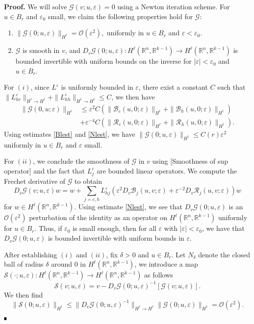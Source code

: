 \documentclass[letterpaper,11pt]{article}
\newcommand{\R}{\mathbb{R}}
\newcommand{\rmO}{\mathcal{O}}
\newcommand{\eps}{\varepsilon}
\newcommand{\Rm}{\mathcal{R}}
\newcommand{\G}{\mathcal{G}}
\newcommand{\cS}{\mathcal{S}}
\numberwithin{equation}{section}
\theoremstyle{plain}
\theoremstyle{remark}
\newenvironment{Proof}[1][.]%
 {\begin{trivlist}\item[]\textbf{Proof#1 }}%
 {\hspace*{\fill}$\rule{0.3\baselineskip}{0.35\baselineskip}$\end{trivlist}}
\begin{document}
\begin{Proof}We will solve $\G(v;u,\eps)=0$ using a Newton iteration scheme. For $u \in B_r$ and $\eps_0$ small, we claim the following properties hold for $\G$:
\begin{enumerate}
\item $\|\G(0;u,\eps)\|_{H^\ell} = \rmO(\eps^2),$ uniformly in $u\in B_r$ and $\eps < \eps_0$.
\item $\G$ is smooth in $v$, and $D_v \G(0; u, \eps):H^\ell(\R^n,\R^{k-1}) \to H^\ell(\R^n,\R^{k-1})$ is bounded invertible with uniform bounds on the inverse for $|\eps|<\eps_0$ and $u \in B_r$. 
\end{enumerate}

For $(i)$, since $L^\eps$ is uniformly bounded in $\eps$, there exist a constant $C$ such that $\| L_{hc}^\eps\|_{H^\ell \to H^\ell}+\| L_{hh}^\eps \|_{H^\ell \to H^\ell } \le C$, we then have
\begin{align*}
\|\G(0,u;\eps)\|_{H^\ell} &\le \eps^2C(\|\mathcal{B}_c(u,0;\eps)\|_{H^\ell} +\|\mathcal{B}_h(u,0;\eps)\|_{H^\ell})\\
&+\eps^{-4}C(\|\Rm_c(u,0;\eps)\|_{H^\ell}+\|\Rm_h(u,0;\eps)\|_{H^\ell}).
\end{align*}
Using estimates \eqref{Blest} and \eqref{Nlest}, we have $\|\G(0;u,\eps)\|_{H^\ell} \le C(r) \eps^2$ uniformly in $u\in B_r$ and $\eps$ small.

For $(ii)$, we conclude the smoothness of $\mathcal{G}$ in $v$ using [Smoothness of sup operator] and the fact that $L^\eps_j$ are bounded linear operators. We compute the Frechet derivative of $\G$ to obtain
\[ 
D_v\G(v;u,\eps) w = w+ \sum_{j=c,h} L_{hj}^\eps (\eps^2 D_v \mathcal{B}_j (u,v;\eps)+ \eps^{-2} D_v\Rm_j(u,v;\eps) ) w
\] 
for $w \in H^\ell(\R^n,\R^{k-1})$. Using estimate \eqref{Nlest}, we see that $D_v\G(0; u, \eps)$ is an $\rmO(\eps^2)$ perturbation of the identity as an operator on $H^\ell(\R^n,\R^{k-1})$ uniformly for $u \in B_r$. Thus, if $\eps_0$ is small enough, then for all $\eps$ with $|\eps|<\eps_0$, we have that $D_v\G(0;u,\eps)$ is bounded invertible with uniform bounds in $\eps$.


After establishing $(i)$ and $(ii)$, fix $\delta>0$ and $u \in B_r$. Let $N_\delta$ denote the closed ball of radius $\delta$ around $0$ in $H^\ell(\R^n,\R^{k-1})$, we introduce a map $\cS(\cdot; u,\eps): H^\ell(\R^n,\R^{k-1}) \to H^\ell(\R^n,\R^{k-1})$ as follows
\[
\cS(v; u,\eps) = v - D_v\G(0;u, \eps)^{-1}[\G(v;u,\eps)].
\]
We then find
\[
\|\cS(0;u,\eps) \|_{H^\ell} \le \|D_v\G(0;u,\eps)^{-1}\|_{H^\ell\to H^\ell} \|\G(0;u, \eps)\|_{H^\ell} = \rmO(\eps^2).
\]


\end{Proof}
\end{document}
